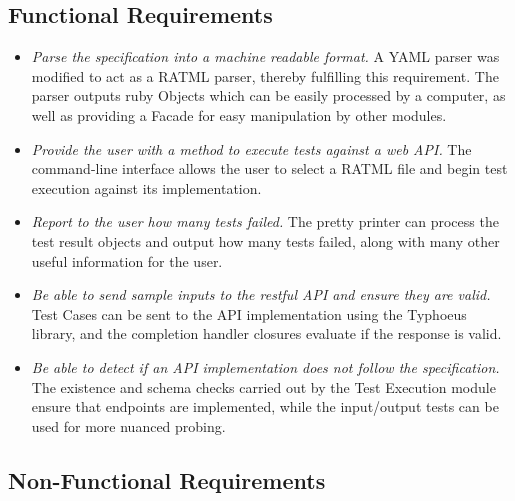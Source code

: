 \subsection{Functional Requirements}

\begin{itemize}
\item \emph{Parse the specification into a machine readable format.} A YAML parser was modified to act as a RATML parser, thereby fulfilling this requirement. The parser outputs ruby Objects which can be easily processed by a computer, as well as providing a Facade for easy manipulation by other modules.
\item \emph{Provide the user with a method to execute tests against a web API.} The command-line interface allows the user to select a RATML file and begin test execution against its implementation.
\item \emph{Report to the user how many tests failed.} The pretty printer can process the test result objects and output how many tests failed, along with many other useful information for the user.
\item \emph{Be able to send sample inputs to the restful API and ensure they are valid.} Test Cases can be sent to the API implementation using the Typhoeus library, and the completion handler closures evaluate if the response is valid.
\item \emph{Be able to detect if an API implementation does not follow the specification.} The existence and schema checks carried out by the Test Execution module ensure that endpoints are implemented, while the input/output tests can be used for more nuanced probing.
\end{itemize}

\subsection{Non-Functional Requirements}

